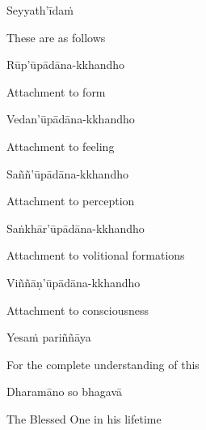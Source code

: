 Seyyath'īdaṁ

\begin{english}
  These are as follows
\end{english}

Rūp'ūpādāna-kkhandho

\begin{english}
  Attachment to form
\end{english}

Vedan'ūpādāna-kkhandho

\begin{english}
  Attachment to feeling
\end{english}

Saññ'ūpādāna-kkhandho

\begin{english}
  Attachment to perception
\end{english}

Saṅkhār'ūpādāna-kkhandho

\begin{english}
  Attachment to volitional formations\ifdigitalversion\makeatletter\hyperlink{endnote16-appendix}\makeatother\fi
\end{english}

Viññāṇ'ūpādāna-kkhandho

\begin{english}
  Attachment to consciousness\ifdigitalversion\makeatletter\hyperlink{endnote17-appendix}\makeatother\fi
\end{english}

\suttaRef{[DN 22]}

Yesaṁ pariññāya

\begin{english}
  For the complete understanding of this
\end{english}

Dharamāno so bhagavā

\begin{english}
  The Blessed One in his lifetime
\end{english}

